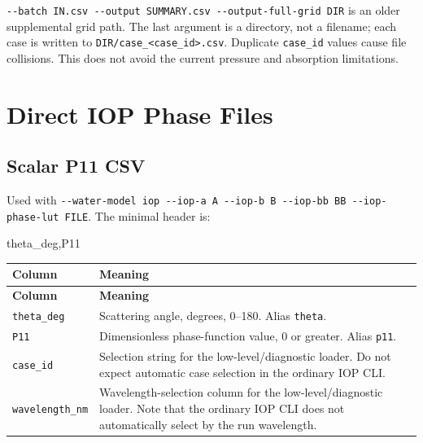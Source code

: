 \texttt{-\allowbreak{}-\allowbreak{}batch IN.\allowbreak{}csv -\allowbreak{}-\allowbreak{}output SUMMARY.\allowbreak{}csv -\allowbreak{}-\allowbreak{}output-\allowbreak{}full-\allowbreak{}grid DIR} is an older supplemental grid path. The last argument is a directory, not a filename; each case is written to \texttt{DIR/\allowbreak{}case\_\allowbreak{}<case\_\allowbreak{}id>.\allowbreak{}csv}. Duplicate \texttt{case\_\allowbreak{}id} values cause file collisions. This does not avoid the current pressure and absorption limitations.

\section{Direct IOP Phase Files}
\label{sec:auto:08_input_formats:4}
\subsection{Scalar P11 CSV}
\label{sec:auto:08_input_formats:4.1}
Used with \texttt{-\allowbreak{}-\allowbreak{}water-\allowbreak{}model iop -\allowbreak{}-\allowbreak{}iop-\allowbreak{}a A -\allowbreak{}-\allowbreak{}iop-\allowbreak{}b B -\allowbreak{}-\allowbreak{}iop-\allowbreak{}bb BB -\allowbreak{}-\allowbreak{}iop-\allowbreak{}phase-\allowbreak{}lut FILE}. The minimal header is:


\begin{ManualCode}
theta_deg,P11
\end{ManualCode}


{\TableFont
\begin{longtable}{@{}>{\raggedright\arraybackslash}p{}>{\raggedright\arraybackslash}p{}@{}}
\toprule
\textbf{Column} & \textbf{Meaning} \\
\midrule
\endfirsthead
\toprule
\textbf{Column} & \textbf{Meaning} \\
\midrule
\endhead
\bottomrule
\endfoot
\texttt{theta\_\allowbreak{}deg} & Scattering angle, degrees, 0--180. Alias \texttt{theta}. \\
\texttt{P11} & Dimensionless phase-function value, 0 or greater. Alias \texttt{p11}. \\
\texttt{case\_\allowbreak{}id} & Selection string for the low-level/diagnostic loader. Do not expect automatic case selection in the ordinary IOP CLI. \\
\texttt{wavelength\_\allowbreak{}nm} & Wavelength-selection column for the low-level/diagnostic loader. Note that the ordinary IOP CLI does not automatically select by the run wavelength. \\
\end{longtable}
}

